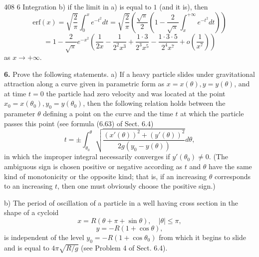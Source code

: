 408
\hfill 6 Integration
b) if the limit in a) is equal to $1$ (and it is), then
$$
\text{erf}(x) = \sqrt{\frac{2}{\pi}} \int_{0}^{x} e^{-t^2} dt = \sqrt{\frac{2}{\pi}} \left( \frac{\sqrt{\pi}}{2} \left( 1 - \frac{2}{\sqrt{\pi}} \int_{x}^{+\infty} e^{-t^2} dt \right) \right)
$$
$$
= 1 - \frac{2}{\sqrt{\pi}} e^{-x^2} \left( \frac{1}{2x} - \frac{1}{2^2 x^3} + \frac{1 \cdot 3}{2^3 x^5} - \frac{1 \cdot 3 \cdot 5}{2^4 x^7} + o\left(\frac{1}{x^7}\right) \right)
$$
as $x \to +\infty$.

\textbf{6.} Prove the following statements.
a) If a heavy particle slides under gravitational attraction along a curve given
in parametric form as $x = x(\theta), y = y(\theta)$, and at time $t = 0$ the particle had zero
velocity and was located at the point $x_0 = x(\theta_0), y_0 = y(\theta_0)$, then the following
relation holds between the parameter $\theta$ defining a point on the curve and the time $t$
at which the particle passes this point (see formula (6.63) of Sect. 6.4)
$$
t = \pm \int_{\theta_0}^{\theta} \sqrt{\frac{(x'(\theta))^2 + (y'(\theta))^2}{2g(y_0 - y(\theta))}} d\theta,
$$
in which the improper integral necessarily converges if $y'(\theta_0) \neq 0$. (The ambiguous
sign is chosen positive or negative according as $t$ and $\theta$ have the same kind of
monotonicity or the opposite kind; that is, if an increasing $\theta$ corresponds to an
increasing $t$, then one must obviously choose the positive sign.)

b) The period of oscillation of a particle in a well having cross section in the
shape of a cycloid
$$
x = R(\theta + \pi + \sin\theta), \quad |\theta| \le \pi,
$$
$$
y = -R(1 + \cos \theta),
$$
is independent of the level $y_0 = -R(1 + \cos \theta_0)$ from which it begins to slide and is
equal to $4\pi \sqrt{R/g}$ (see Problem 4 of Sect. 6.4).